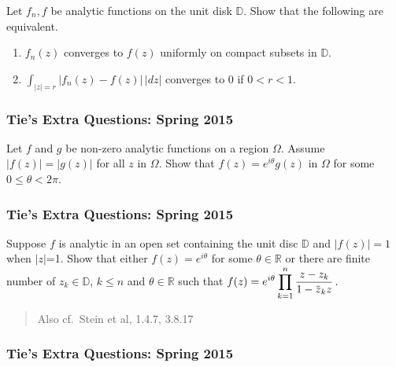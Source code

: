 Let \(f_n, f\) be analytic functions on the unit disk \({\mathbb D}\).
Show that the following are equivalent.

\begin{enumerate}
\def\labelenumi{(\roman{enumi})}
\item
  \(f_n(z)\) converges to \(f(z)\) uniformly on compact subsets in
  \(\mathbb D\).
\item
  \(\int_{|z|= r} |f_n(z) - f(z)| \, |dz|\) converges to \(0\) if
  \(0< r<1\).
\end{enumerate}

\hypertarget{ties-extra-questions-spring-2015-1}{%
\subsubsection{Tie's Extra Questions: Spring
2015}\label{ties-extra-questions-spring-2015-1}}

Let \(f\) and \(g\) be non-zero analytic functions on a region
\(\Omega\). Assume \(|f(z)| = |g(z)|\) for all \(z\) in \(\Omega\). Show
that \(f(z) = e^{i \theta} g(z)\) in \(\Omega\) for some
\(0 \leq \theta < 2 \pi\).

\hypertarget{ties-extra-questions-spring-2015-2}{%
\subsubsection{Tie's Extra Questions: Spring
2015}\label{ties-extra-questions-spring-2015-2}}

Suppose \(f\) is analytic in an open set containing the unit disc
\(\mathbb D\) and \(|f(z)| =1\) when \(|z|\)=1. Show that either
\(f(z) = e^{i \theta}\) for some \(\theta \in \mathbb R\) or there are
finite number of \(z_k \in \mathbb D\), \(k \leq n\) and
\(\theta \in \mathbb R\) such that
\(\displaystyle f(z) = e^{i\theta} \prod_{k=1}^n \frac{z-z_k}{1 - \mkern 1.5mu\overline{\mkern-1.5muz\mkern-1.5mu}\mkern 1.5mu_k z } \, .\)

\begin{quote}
Also cf.~Stein et al, 1.4.7, 3.8.17
\end{quote}

\hypertarget{ties-extra-questions-spring-2015-3}{%
\subsubsection{Tie's Extra Questions: Spring
2015}\label{ties-extra-questions-spring-2015-3}}

